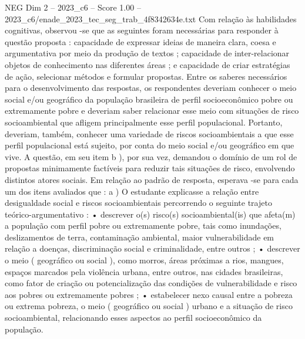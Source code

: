 \begin{textsample}{NEG Dim 2 – 2023\_c6 – Score 1.00 – 2023\_c6/enade\_2023\_tec\_seg\_trab\_4f8342634e.txt}
Com relação às habilidades cognitivas, observou -se que as seguintes foram necessárias para responder à questão proposta : capacidade de expressar ideias de maneira clara, coesa e argumentativa por meio da produção de textos ; capacidade de inter-relacionar objetos de conhecimento nas diferentes áreas ; e capacidade de criar estratégias de ação, selecionar métodos e formular propostas.
Entre os saberes necessários para o desenvolvimento das respostas, os respondentes deveriam conhecer o meio social e/ou geográfico da população brasileira de perfil socioeconômico pobre ou extremamente pobre e deveriam saber relacionar esse meio com situações de risco socioambiental que afligem principalmente esse perfil populacional.
Portanto, deveriam, também, conhecer uma variedade de riscos socioambientais a que esse perfil populacional está sujeito, por conta do meio social e/ou geográfico em que vive.
A questão, em seu item b ), por sua vez, demandou o domínio de um rol de propostas minimamente factíveis para reduzir tais situações de risco, envolvendo distintos atores sociais.
Em relação ao padrão de resposta, esperava -se para cada um dos itens avaliados que : a ) O estudante explicasse a relação entre desigualdade social e riscos socioambientais percorrendo o seguinte trajeto teórico-argumentativo : • descrever o(s) risco(s) socioambiental(is) que afeta(m) a população com perfil pobre ou extremamente pobre, tais como inundações, deslizamentos de terra, contaminação ambiental, maior vulnerabilidade em relação a doenças, discriminação social e criminalidade, entre outros ; • descrever o meio ( geográfico ou social ), como morros, áreas próximas a rios, mangues, espaços marcados pela violência urbana, entre outros, nas cidades brasileiras, como fator de criação ou potencialização das condições de vulnerabilidade e risco aos pobres ou extremamente pobres ; • estabelecer nexo causal entre a pobreza ou extrema pobreza, o meio ( geográfico ou social ) urbano e a situação de risco socioambiental, relacionando esses aspectos ao perfil socioeconômico da população.

\end{textsample}
